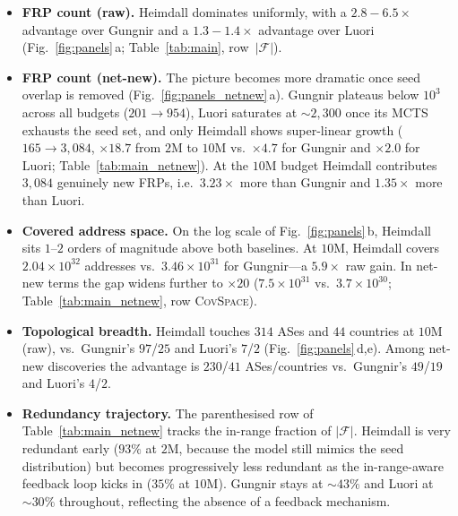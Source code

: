 \documentclass[conference]{IEEEtran}
\begin{document}
\begin{itemize}
   \item \textbf{FRP count (raw).}  Heimdall dominates uniformly, with
   a $2.8\!-\!6.5\times$ advantage over Gungnir and a
   $1.3\!-\!1.4\times$ advantage over Luori
   (Fig.~\ref{fig:panels}\,a; Table~\ref{tab:main}, row~$|\mathcal{F}|$).
   \item \textbf{FRP count (net-new).}  The picture becomes more
   dramatic once seed overlap is removed
   (Fig.~\ref{fig:panels_netnew}\,a).  Gungnir plateaus below
   $10^{3}$ across all budgets ($201\!\to\!954$), Luori saturates
   at $\sim\!2{,}300$ once its MCTS exhausts the seed set, and
   only Heimdall shows super-linear growth
   ($165\!\to\!3{,}084$, $\times 18.7$ from $2$M to $10$M
   vs.\ $\times 4.7$ for Gungnir and $\times 2.0$ for Luori;
   Table~\ref{tab:main_netnew}).  At the $10$M budget Heimdall
   contributes $3{,}084$ genuinely new FRPs, i.e.\ $3.23\times$
   more than Gungnir and $1.35\times$ more than Luori.
   \item \textbf{Covered address space.}  On the log scale of
   Fig.~\ref{fig:panels}\,b, Heimdall sits $1$--$2$ orders of
   magnitude above both baselines.  At $10\text{M}$,
   Heimdall covers $2.04\!\times\!10^{32}$ addresses vs.\
   $3.46\!\times\!10^{31}$ for Gungnir---a $5.9\times$ raw gain.
   In net-new terms the gap widens further to $\times 20$
   ($7.5\!\times\!10^{31}$ vs.\ $3.7\!\times\!10^{30}$;
   Table~\ref{tab:main_netnew}, row \textsc{CovSpace}).
   \item \textbf{Topological breadth.}  Heimdall touches
   $314$ ASes and $44$ countries at $10\text{M}$ (raw), vs.\
   Gungnir's $97$/$25$ and Luori's $7$/$2$
   (Fig.~\ref{fig:panels}\,d,e).  Among net-new discoveries the
   advantage is $230$/$41$ ASes/countries vs.\ Gungnir's
   $49$/$19$ and Luori's $4$/$2$.
   \item \textbf{Redundancy trajectory.}  The parenthesised row
   of Table~\ref{tab:main_netnew} tracks the in-range fraction
   of $|\mathcal{F}|$.  Heimdall is very redundant early
   ($93\%$ at $2$M, because the model still mimics the seed
   distribution) but becomes progressively less redundant as
   the in-range-aware feedback loop kicks in ($35\%$ at $10$M).
   Gungnir stays at $\sim\!43\%$ and Luori at $\sim\!30\%$
   throughout, reflecting the absence of a feedback mechanism.
\end{itemize}
\end{document}
